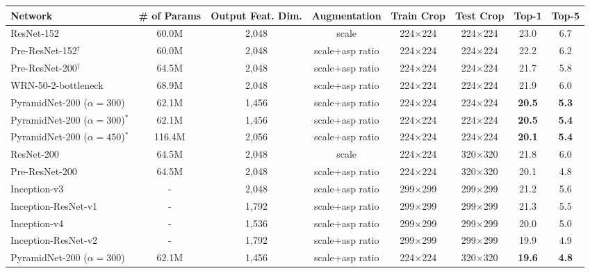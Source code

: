 \documentclass[10pt,twocolumn,letterpaper]{article}
\begin{document}
\begin{table*}[t]
\fontsize{9}{10}\selectfont
\begin{center}
\centering
\begin{tabular}{|l|c|c|c|c|c|c|c|}
\hline
Network & \# of Params & Output Feat. Dim. & Augmentation & Train Crop & Test Crop & Top-1 & Top-5 \\
\hline\hline
ResNet-152~\cite{resnet} & 60.0M & 2,048 & scale & 224$\times$224 & 224$\times$224 & 23.0 & 6.7 \\
Pre-ResNet-152$^\dagger$~\cite{preresnet} & 60.0M & 2,048 & scale+asp ratio & 224$\times$224 & 224$\times$224 & 22.2 & 6.2\\
Pre-ResNet-200$^\dagger$~\cite{preresnet} & 64.5M & 2,048 & scale+asp ratio & 224$\times$224 & 224$\times$224 & 21.7 & 5.8\\
WRN-50-2-bottleneck~\cite{wideresnet} & 68.9M & 2,048 & scale+asp ratio & 224$\times$224 & 224$\times$224 & 21.9 & 6.0\\
PyramidNet-200 ($\alpha=300$) & 62.1M & 1,456 & scale+asp ratio & 224$\times$224 & 224$\times$224 & {\bf20.5} & {\bf5.3}\\
PyramidNet-200 ($\alpha=300$)$^*$ & 62.1M & 1,456 & scale+asp ratio & 224$\times$224 & 224$\times$224 & {\bf20.5} & {\bf5.4}\\
PyramidNet-200 ($\alpha=450$)$^*$ & 116.4M & 2,056 & scale+asp ratio & 224$\times$224 & 224$\times$224 & {\bf20.1} & {\bf5.4}\\
\hline
ResNet-200~\cite{resnet} & 64.5M & 2,048 & scale & 224$\times$224 & 320$\times$320 & 21.8 & 6.0\\
Pre-ResNet-200~\cite{preresnet} & 64.5M & 2,048 & scale+asp ratio & 224$\times$224 & 320$\times$320 & 20.1 & 4.8\\
Inception-v3~\cite{Inceptionv3} & - & 2,048 & scale+asp ratio  & 299$\times$299 & 299$\times$299 & 21.2 & 5.6\\
Inception-ResNet-v1~\cite{InceptionResnet}  &  - & 1,792 & scale+asp ratio & 299$\times$299 & 299$\times$299 & 21.3 & 5.5\\
Inception-v4~\cite{InceptionResnet}  & - & 1,536 & scale+asp ratio & 299$\times$299 & 299$\times$299 & 20.0 & 5.0\\
Inception-ResNet-v2~\cite{InceptionResnet}  &  - & 1,792 & scale+asp ratio & 299$\times$299 & 299$\times$299 & 19.9 & 4.9\\
PyramidNet-200 ($\alpha=300$) & 62.1M & 1,456 & scale+asp ratio & 224$\times$224 & 320$\times$320 & {\bf19.6} & {\bf4.8}\\

\end{tabular}
\end{center}
\end{table*}
\end{document}
